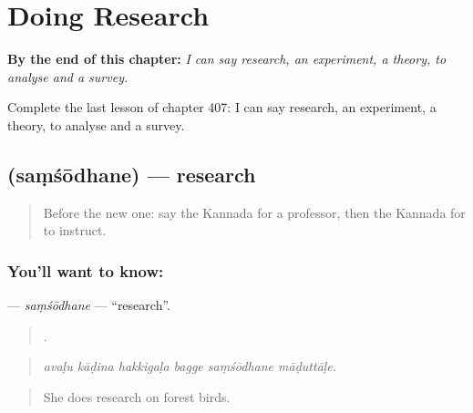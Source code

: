 
\chapter{Doing Research}
\label{ch:ka-doing-research}

\begin{chapteropening}
\textbf{By the end of this chapter:} \emph{I can say research, an experiment, a theory, to analyse and a survey.}

Complete the last lesson of chapter 407: I can say research, an experiment, a theory, to analyse and a survey.
\end{chapteropening}

\section[\texorpdfstring{\kn{ಸಂಶೋಧನೆ} (saṃśōdhane)}{ಸಂಶೋಧನೆ (saṃśōdhane)}]{ (saṃśōdhane) — research}

\label{lesson:KA-C407-samsodhane}



\begin{quote}
Before the new one: say the Kannada for a professor, then the Kannada for to instruct.
\end{quote}

\subsection*{You'll want to know: }
\textbf{} — \emph{saṃśōdhane} — \textquotedblleft{}research\textquotedblright{}.

\begin{quote}
     .
\end{quote}

\begin{quote}
\emph{avaḷu kāḍina hakkigaḷa bagge saṃśōdhane māḍuttāḷe.}
\end{quote}

\begin{quote}
She does research on forest birds.
\end{quote}

